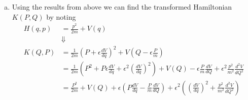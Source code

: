 \documentclass[11pt]{article}
\numberwithin{equation}{section}
\begin{document}
\begin{enumerate}[(a)]
\item Using the results from above we can find the transformed Hamiltonian $K(P,Q)$ by noting
\begin{align*}
H(q,p) &= \frac{p^2}{2m} + V(q)\\
&\Downarrow\\
K(Q,P) &= \frac{1}{2m}\left(P+\epsilon\frac{dV}{dq}\right)^2 + V\left(Q-\epsilon\frac{P}{m}\right)\\
&= \frac{1}{2m}\left(P^2+P\epsilon\frac{dV}{dq}+\epsilon^2\left(\frac{dV}{dq}\right)^2\right) + V(Q) - \epsilon\frac{P}{m}\frac{dV}{dQ} + \epsilon^2\frac{p^2}{m^2}\frac{d^2V}{dQ^2}\\
&= \frac{P^2}{2m} + V(Q) + \epsilon\left(P\frac{dV}{dq}-\frac{P}{m}\frac{dV}{dQ}\right) + \epsilon^2\left(\left(\frac{dV}{dq}\right)^2 + \frac{p^2}{m^2}\frac{d^2V}{dQ^2}\right)
\end{align*}
\end{enumerate}

\pagebreak
\end{document}
